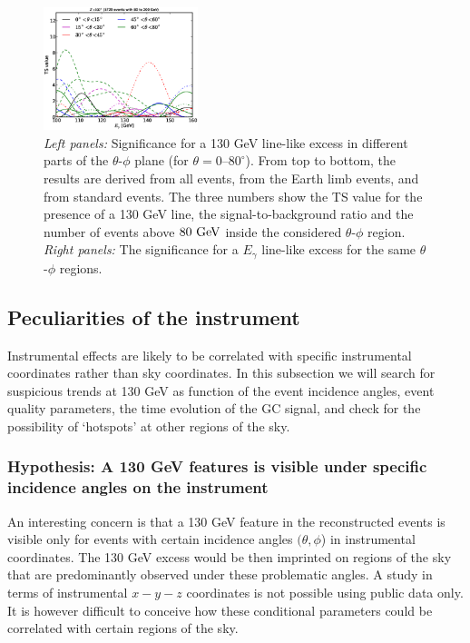 \documentclass[aps,twocolumn,prd,superscriptaddress,showpacs,nofootinbib,fixfloat]{revtex4}
\newcommand{\GeV}{{\rm ~GeV}}
\begin{document}
\begin{figure}
  \includegraphics[width=0.40\textwidth]{plots/scan_z.LE.100.eps}
  \caption{\emph{Left panels:} Significance for a 130 GeV
  line-like excess in different parts of the $\theta$-$\phi$
  plane (for $\theta=0$--$80^\circ$). From top to bottom,
  the results are derived from all events, from the Earth
  limb events, and from standard events. The three numbers
  show the TS value for the presence of a 130 GeV line, the
  signal-to-background ratio and the number of events above
  $80\GeV$ inside the considered $\theta$-$\phi$ region.
  \emph{Right panels:} The significance for a $E_\gamma$
  line-like excess for the same $\theta$-$\phi$ regions.}
  \label{fig:polarPlotsAll}
\end{figure}


\subsection{Peculiarities of the instrument}
Instrumental effects are likely to be correlated with
specific instrumental coordinates rather than sky
coordinates. In this subsection we will search for
suspicious trends at 130 GeV as function of the event
incidence angles, event quality parameters, the time
evolution of the GC signal, and check for the possibility of
`hotspots' at other regions of the sky.

\subsubsection{Hypothesis: A 130 GeV features is visible
under specific incidence angles on the instrument}


An interesting concern is that a 130 GeV feature in the
reconstructed events is visible only for events with certain
incidence angles $(\theta, \phi$) in instrumental
coordinates. The 130 GeV excess would be then imprinted on
regions of the sky that are predominantly observed under
these problematic angles. A study in terms of instrumental
$x-y-z$ coordinates is not possible using public data only.
It is however difficult to conceive how these conditional
parameters could be correlated with certain regions of the
sky.
\end{document}
